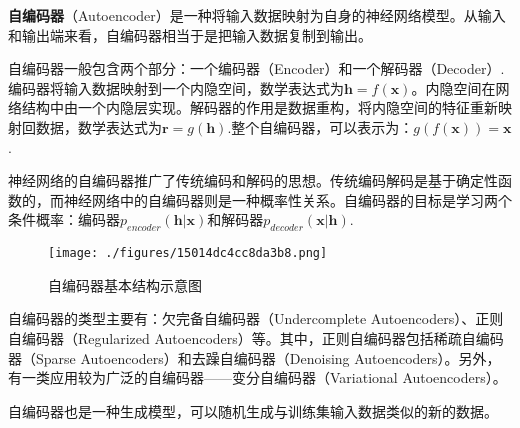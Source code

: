 
\begin{issues}
\issueDraft
\end{issues}


\textbf{自编码器}（Autoencoder）是一种将输入数据映射为自身的神经网络模型。从输入和输出端来看，自编码器相当于是把输入数据复制到输出。

自编码器一般包含两个部分：一个编码器（Encoder）和一个解码器（Decoder）.编码器将输入数据映射到一个内隐空间，数学表达式为$\boldsymbol{h}=f(\boldsymbol{x})$。内隐空间在网络结构中由一个内隐层实现。解码器的作用是数据重构，将内隐空间的特征重新映射回数据，数学表达式为$\boldsymbol{r}=g(\boldsymbol{h})$.整个自编码器，可以表示为：$g(f(\boldsymbol{x}))=\boldsymbol{x}$.

神经网络的自编码器推广了传统编码和解码的思想。传统编码解码是基于确定性函数的，而神经网络中的自编码器则是一种概率性关系。自编码器的目标是学习两个条件概率：编码器$p_{encoder}(\boldsymbol{h}|\boldsymbol{x})$和解码器$p_{decoder}(\boldsymbol{x}|\boldsymbol{h})$\cite{GDL}.

\begin{figure}[ht]
\centering
\texttt{[image: ./figures/15014dc4cc8da3b8.png]}
\caption{自编码器基本结构示意图 \cite{GDL}} \label{fig_AE_1} 
\end{figure}

自编码器的类型主要有：欠完备自编码器（Undercomplete Autoencoders）、正则自编码器（Regularized Autoencoders）等。其中，正则自编码器包括稀疏自编码器（Sparse Autoencoders）和去躁自编码器（Denoising Autoencoders）。另外，有一类应用较为广泛的自编码器——变分自编码器（Variational Autoencoders）。

自编码器也是一种生成模型，可以随机生成与训练集输入数据类似的新的数据。